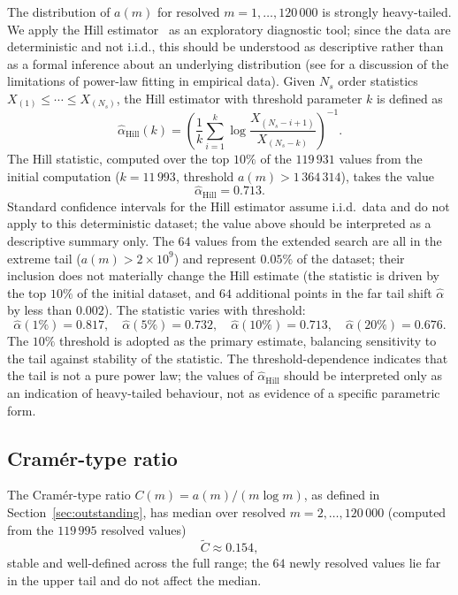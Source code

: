 \documentclass[pdflatex,sn-mathphys-num,Numbered]{sn-jnl}
\theoremstyle{thmstyleone}
\theoremstyle{thmstylethree}
\theoremstyle{thmstyletwo}
\numberwithin{equation}{section}
\begin{document}
The distribution of $a(m)$ for resolved $m = 1, \ldots, 120\,000$ is
strongly heavy-tailed.
We apply the Hill estimator~\cite{Hill1975} as an exploratory
diagnostic tool; since the data are deterministic and not
i.i.d., this should be understood as descriptive rather than as
a formal inference about an underlying distribution
(see \cite{Clauset2009} for a discussion of the limitations of
power-law fitting in empirical data).
Given $N_s$ order statistics $X_{(1)} \leq \cdots \leq X_{(N_s)}$, the
Hill estimator with threshold parameter $k$ is defined as
\[
\hat{\alpha}_{\mathrm{Hill}}(k)
= \left(
\frac{1}{k} \sum_{i=1}^{k}
\log \frac{X_{(N_s-i+1)}}{X_{(N_s-k)}}
\right)^{-1}.
\]
The Hill statistic, computed over the top $10\%$ of the $119\,931$
values from the initial computation
($k = 11\,993$, threshold $a(m) > 1\,364\,314$), takes the value
\[
\hat{\alpha}_{\mathrm{Hill}} = 0.713.
\]
Standard confidence intervals for the Hill estimator assume i.i.d.\
data and do not apply to this deterministic dataset; the value above
should be interpreted as a descriptive summary only.
The $64$ values from the extended search are all in the extreme tail
($a(m) > 2 \times 10^9$) and represent $0.05\%$ of the dataset;
their inclusion does not materially change the Hill estimate
(the statistic is driven by the top $10\%$ of the initial dataset,
and $64$ additional points in the far tail shift $\hat{\alpha}$ by
less than $0.002$).
The statistic varies with threshold:
\[
\hat{\alpha}(1\%) = 0.817, \quad
\hat{\alpha}(5\%) = 0.732, \quad
\hat{\alpha}(10\%) = 0.713, \quad
\hat{\alpha}(20\%) = 0.676.
\]
The $10\%$ threshold is adopted as the primary estimate,
balancing sensitivity to the tail against stability of the statistic.
The threshold-dependence indicates that the tail is not a pure power
law; the values of $\hat{\alpha}_{\mathrm{Hill}}$ should be interpreted
only as an indication of heavy-tailed behaviour, not as evidence of a
specific parametric form.

\subsection{Cram\'er-type ratio}
\label{sec:cramerratio}

The Cram\'er-type ratio $C(m) = a(m)/(m \log m)$, as defined in
Section~\ref{sec:outstanding}, has median over resolved
$m = 2, \ldots, 120\,000$
(computed from the $119\,995$ resolved values)
\[
\widetilde{C} \approx 0.154,
\]
stable and well-defined across the full range; the $64$ newly resolved
values lie far in the upper tail and do not affect the median.
\end{document}
